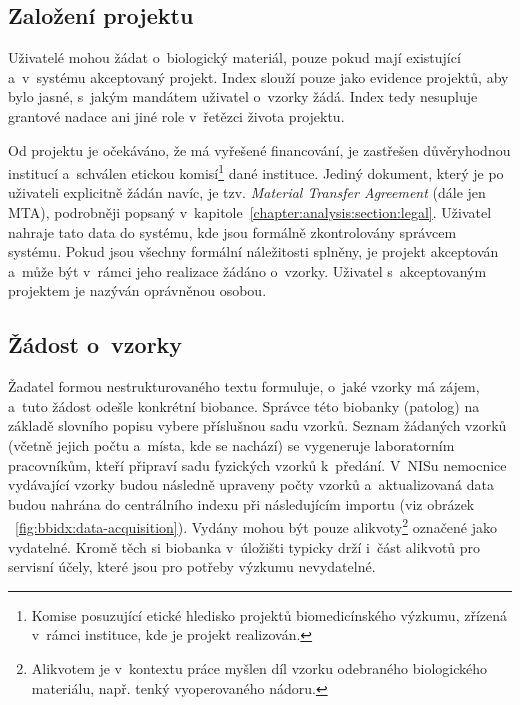 \documentclass[11pt, draft, oneside]{fithesis2}
\begin{document}
\subsection{Založení projektu}
Uživatelé mohou žádat o~biologický materiál, pouze pokud mají existující a~v~systému akceptovaný projekt. Index slouží pouze jako evidence projektů, aby bylo jasné, s~jakým mandátem uživatel o~vzorky žádá. Index tedy nesupluje grantové nadace ani jiné role v~řetězci života projektu. 

Od projektu je očekáváno, že má vyřešené financování, je zastřešen důvěryhodnou institucí a~schválen etickou komisí\footnote{Komise posuzující etické hledisko projektů biomedicínského výzkumu, zřízená v~rámci instituce, kde je projekt realizován.} dané instituce. Jediný dokument, který je po uživateli explicitně žádán navíc, je tzv. \textit{Material Transfer Agreement} (dále jen MTA), podrobněji popsaný v~kapitole~\ref{chapter:analysis:section:legal}. Uživatel nahraje tato data do systému, kde jsou formálně zkontrolovány správcem systému. Pokud jsou všechny formální náležitosti splněny, je projekt akceptován a~může být v~rámci jeho realizace žádáno o~vzorky.
Uživatel s~akceptovaným projektem je nazýván oprávněnou osobou. 

\subsection{Žádost o~vzorky}

Žadatel formou nestrukturovaného textu formuluje, o~jaké vzorky má zájem, a~tuto žádost odešle konkrétní biobance. Správce této biobanky (patolog) na základě slovního popisu vybere příslušnou sadu vzorků. Seznam žádaných vzorků (včetně jejich počtu a~místa, kde se nachází) se vygeneruje laboratorním pracovníkům, kteří připraví sadu fyzických vzorků k~předání. V~NISu nemocnice vydávající vzorky budou následně upraveny počty vzorků a~aktualizovaná data budou nahrána do centrálního indexu při následujícím importu (viz obrázek ~\ref{fig:bbidx:data-acquisition}). Vydány mohou být pouze alikvoty\footnote{Alikvotem je v~kontextu práce myšlen díl vzorku odebraného biologického materiálu, např. tenký  vyoperovaného nádoru.} označené jako vydatelné. Kromě těch si biobanka v~úložišti typicky drží i~část alikvotů pro servisní účely, které jsou pro potřeby výzkumu nevydatelné.
\end{document}
